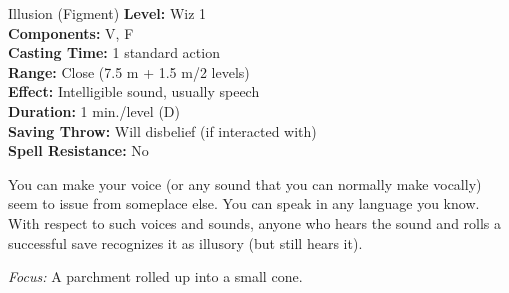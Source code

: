 {Illusion (Figment)}
{
	\textbf{Level:}
	Wiz 1\\
	\textbf{Components:}
	V, F\\
	\textbf{Casting Time:}
	1 standard action\\
	\textbf{Range:}
	Close (7.5 m + 1.5 m/2 levels)\\
	\textbf{Effect:}
	Intelligible sound, usually speech\\
	\textbf{Duration:}
	1 min./level (D)\\
	\textbf{Saving Throw:}
	Will disbelief (if interacted with)\\
	\textbf{Spell Resistance:}
	No\\
}
{
	You can make your voice (or any sound that you can normally make vocally) seem to issue from someplace else. You can speak in any language you know. With respect to such voices and sounds, anyone who hears the sound and rolls a successful save recognizes it as illusory (but still hears it).

	\textit{Focus:}
	A parchment rolled up into a small cone.

}
